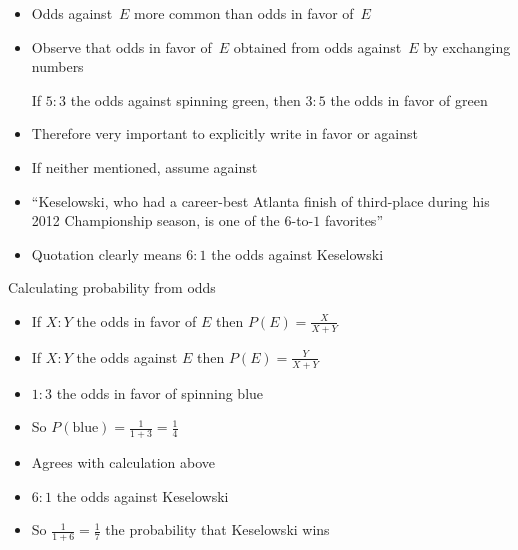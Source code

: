 \documentclass{beamer}
\theoremstyle{definition}
\begin{document}
\begin{frame}
\begin{itemize}
\item Odds against~$E$ more common than odds in favor of~$E$
\item Observe that odds in favor of~$E$ obtained
from odds against~$E$ by exchanging numbers
\begin{example} If $5:3$ the odds against spinning green,
then $3:5$ the odds in favor of green
\end{example}
\item Therefore very important to explicitly write
\alert{in favor} or \alert{against}
\item If neither mentioned, assume \alert{against}
\end{itemize}
\begin{example}
\begin{itemize}
\item ``Keselowski, who had a career-best Atlanta finish of third-place
during his 2012 Championship season, is one of the \alert{$6$-to-$1$} favorites''
\item Quotation clearly means $6:1$ the odds \alert{against} Keselowski
\end{itemize}
\end{example}
\end{frame}

\begin{frame}{Calculating probability from odds}
\begin{itemize}
\item If $X:Y$ the odds in favor of $E$
then $P\left(E\right)=\frac{X}{X+Y}$
\item If $X:Y$ the odds against $E$
then $P\left(E\right)=\frac{Y}{X+Y}$
\end{itemize}
\begin{example}
\begin{itemize}
\item $1:3$ the odds in favor of spinning blue
\item So $P\left(\text{blue}\right)=\frac{1}{1+3}=\frac{1}{4}$
\item Agrees with calculation above
\end{itemize}
\end{example}
\begin{example}
\begin{itemize}
\item $6:1$ the odds against Keselowski
\item So $\frac{1}{1+6}=\frac{1}{7}$ the probability
that Keselowski wins
\end{itemize}
\end{example}
\end{frame}
\end{document}
